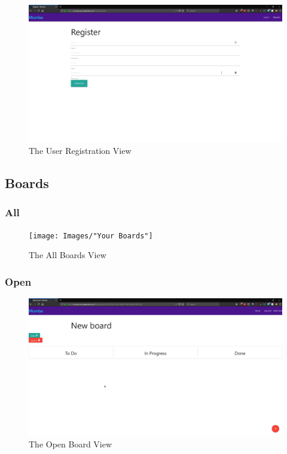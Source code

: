 \documentclass[letterpaper]{article}
\begin{document}
\begin{figure}[H]
  \centering
  \caption{The User Registration View}
  \includegraphics[scale=0.2]{Images/Register}
\end{figure}


\subsection{Boards}

\subsubsection{All}
\begin{figure}[H]
  \centering
  \caption{The All Boards View}
  \texttt{[image: Images/"Your Boards"]}
\end{figure}
\subsubsection{Open}
\begin{figure}[H]
  \centering
  \caption{The Open Board View}
  \includegraphics[scale=0.2]{Images/BlankBoard}
\end{figure}
\end{document}
